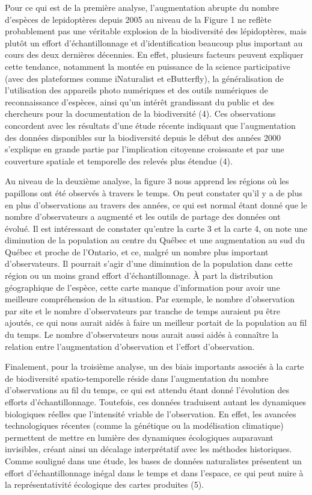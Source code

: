 \documentclass[9pt,twocolumn,twoside,]{pnas-new}
\begin{document}
Pour ce qui est de la première analyse, l'augmentation abrupte du nombre
d'espèces de lepidoptères depuis 2005 au niveau de la Figure 1 ne
reflète probablement pas une véritable explosion de la biodiversité des
lépidoptères, mais plutôt un effort d'échantillonnage et
d'identification beaucoup plus important au cours des deux dernières
décennies. En effet, plusieurs facteurs peuvent expliquer cette
tendance, notamment la montée en puissance de la science participative
(avec des plateformes comme iNaturalist et eButterfly), la
généralisation de l'utilisation des appareils photo numériques et des
outils numériques de reconnaissance d'espèces, ainsi qu'un intérêt
grandissant du public et des chercheurs pour la documentation de la
biodiversité (4). Ces observations concordent avec les résultats d'une
étude récente indiquant que l'augmentation des données disponibles sur
la biodiversité depuis le début des années 2000 s'explique en grande
partie par l'implication citoyenne croissante et par une couverture
spatiale et temporelle des relevés plus étendue (4).

Au niveau de la deuxième analyse, la figure 3 nous apprend les régions
où les papillons ont été observés à travers le temps. On peut constater
qu'il y a de plus en plus d'observations au travers des années, ce qui
est normal étant donné que le nombre d'observateurs a augmenté et les
outils de partage des données ont évolué. Il est intéressant de
constater qu'entre la carte 3 et la carte 4, on note une diminution de
la population au centre du Québec et une augmentation au sud du Québec
et proche de l'Ontario, et ce, malgré un nombre plus important
d'observateurs. Il pourrait s'agir d'une diminution de la population
dans cette région ou un moins grand effort d'échantillonnage. À part la
distribution géographique de l'espèce, cette carte manque d'information
pour avoir une meilleure compréhension de la situation. Par exemple, le
nombre d'observation par site et le nombre d'observateurs par tranche de
temps auraient pu être ajoutés, ce qui nous aurait aidés à faire un
meilleur portait de la population au fil du temps. Le nombre
d'observateurs nous aurait aussi aidés à connaître la relation entre
l'augmentation d'observation et l'effort d'observation.

Finalement, pour la troisième analyse, un des biais importants associés
à la carte de biodiversité spatio-temporelle réside dans l'augmentation
du nombre d'observations au fil du temps, ce qui est attendu étant donné
l'évolution des efforts d'échantillonnage. Toutefois, ces données
traduisent autant les dynamiques biologiques réelles que l'intensité
vriable de l'observation. En effet, les avancées technologiques récentes
(comme la génétique ou la modélisation climatique) permettent de mettre
en lumière des dynamiques écologiques auparavant invisibles, créant
ainsi un décalage interprétatif avec les méthodes historiques. Comme
souligné dans une étude, les bases de données naturalistes présentent un
effort d'échantillonnage inégal dans le temps et dans l'espace, ce qui
peut nuire à la représentativité écologique des cartes produites (5).
\end{document}
